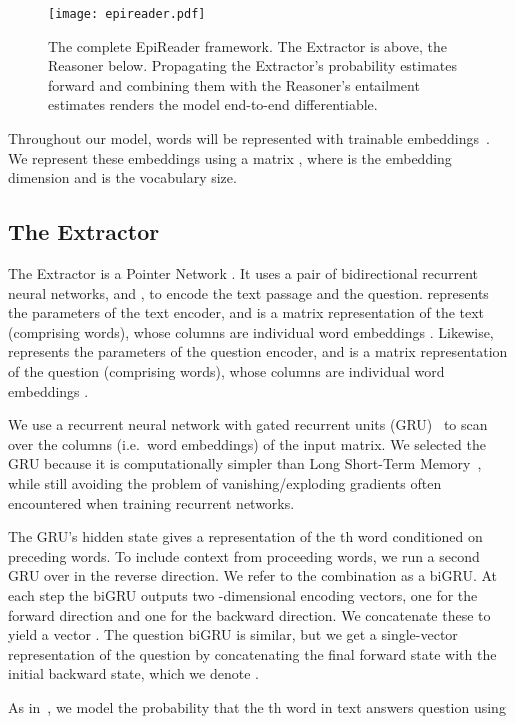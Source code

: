 \documentclass[11pt,letterpaper]{article}
\begin{document}
\begin{figure*}[t]
  \centering
  \texttt{[image: epireader.pdf]}
  \caption{The complete EpiReader framework. The Extractor is above, the Reasoner below. Propagating the Extractor's probability estimates forward and combining them with the Reasoner's entailment estimates renders the model end-to-end differentiable.}
  \label{fig:framework}
\end{figure*}

Throughout our model, words will be represented with trainable embeddings~\cite{bengio2000}. We represent these embeddings using a matrix , where  is the embedding dimension and  is the vocabulary size.

\subsection{The Extractor}
\label{sec:extractor}
The Extractor is a Pointer Network \cite{vinyals2015}. It uses a pair of bidirectional recurrent neural networks,  and , to encode the text passage and the question.  represents the parameters of the text encoder, and  is a matrix representation of the text (comprising  words), whose columns are individual word embeddings . Likewise,  represents the parameters of the question encoder, and  is a matrix representation of the question (comprising  words), whose columns are individual word embeddings .

We use a recurrent neural network with gated recurrent units (GRU)~\cite{bahdanau2014} to scan over the columns (i.e.~word embeddings) of the input matrix.
We selected the GRU because it is computationally simpler than Long Short-Term Memory~\cite{hochreiter1997}, while still avoiding the problem of vanishing/exploding gradients often encountered when training recurrent networks.

The GRU's hidden state gives a representation of the th word conditioned on preceding words. To include context from proceeding words, we run a second GRU over  in the reverse direction. We refer to the combination as a biGRU. At each step the biGRU outputs two -dimensional encoding vectors, one for the forward direction and one for the backward direction. We concatenate these to yield a vector . The question biGRU is similar, but we get a single-vector representation of the question by concatenating the final forward state with the initial backward state, which we denote .

As in~, we model the probability that the th word in text  answers question  using
\end{document}
